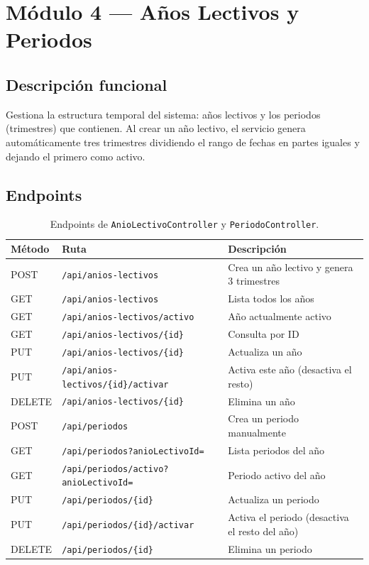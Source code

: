 \documentclass[11pt,a4paper,oneside]{article}
\newcommand{\code}[1]{\texttt{\small #1}}
\begin{document}
\section{Módulo 4 — Años Lectivos y Periodos}

\subsection{Descripción funcional}

Gestiona la estructura temporal del sistema: años lectivos y los periodos (trimestres)
que contienen. Al crear un año lectivo, el servicio genera automáticamente tres trimestres
dividiendo el rango de fechas en partes iguales y dejando el primero como activo.

\subsection{Endpoints}

\begin{table}[h]
\centering\renewcommand{\arraystretch}{1.15}\small
\begin{tabular}{@{}p{1.4cm} p{6.5cm} p{6.0cm}@{}}
\toprule
\textbf{Método} & \textbf{Ruta} & \textbf{Descripción} \\
\midrule
POST   & \code{/api/anios-lectivos}                       & Crea un año lectivo y genera 3 trimestres \\
GET    & \code{/api/anios-lectivos}                       & Lista todos los años \\
GET    & \code{/api/anios-lectivos/activo}                & Año actualmente activo \\
GET    & \code{/api/anios-lectivos/\{id\}}                & Consulta por ID \\
PUT    & \code{/api/anios-lectivos/\{id\}}                & Actualiza un año \\
PUT    & \code{/api/anios-lectivos/\{id\}/activar}        & Activa este año (desactiva el resto) \\
DELETE & \code{/api/anios-lectivos/\{id\}}                & Elimina un año \\
\midrule
POST   & \code{/api/periodos}                             & Crea un periodo manualmente \\
GET    & \code{/api/periodos?anioLectivoId=}              & Lista periodos del año \\
GET    & \code{/api/periodos/activo?anioLectivoId=}       & Periodo activo del año \\
PUT    & \code{/api/periodos/\{id\}}                      & Actualiza un periodo \\
PUT    & \code{/api/periodos/\{id\}/activar}              & Activa el periodo (desactiva el resto del año) \\
DELETE & \code{/api/periodos/\{id\}}                      & Elimina un periodo \\
\bottomrule
\end{tabular}
\caption{Endpoints de \code{AnioLectivoController} y \code{PeriodoController}.}
\end{table}
\end{document}
